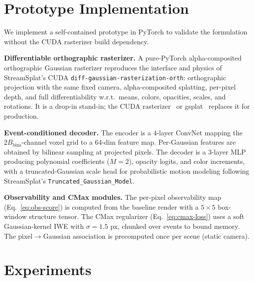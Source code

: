 \section{Prototype Implementation}
\label{sec:impl}

We implement a self-contained prototype in PyTorch to validate the formulation without the CUDA rasterizer build dependency.

\noindent\textbf{Differentiable orthographic rasterizer.}
A pure-PyTorch alpha-composited orthographic Gaussian rasterizer reproduces the interface and physics of StreamSplat's CUDA \texttt{diff-gaussian-rasterization-orth}: orthographic projection with the same fixed camera, alpha-composited splatting, per-pixel depth, and full differentiability w.r.t.\ means, colors, opacities, scales, and rotations. It is a drop-in stand-in; the CUDA rasterizer~\cite{kerbl3Dgaussians} or gsplat~\cite{ye2024gsplat} replaces it for production.

\noindent\textbf{Event-conditioned decoder.}
The encoder is a 4-layer ConvNet mapping the $2B_{\text{bins}}$-channel voxel grid to a 64-dim feature map. Per-Gaussian features are obtained by bilinear sampling at projected pixels. The decoder is a 3-layer MLP producing polynomial coefficients ($M{=}2$), opacity logits, and color increments, with a truncated-Gaussian scale head for probabilistic motion modeling following StreamSplat's \texttt{Truncated\_Gaussian\_Model}.

\noindent\textbf{Observability and CMax modules.}
The per-pixel observability map (Eq.~\ref{eq:obs-score}) is computed from the baseline render with a $5{\times}5$ box-window structure tensor. The CMax regularizer (Eq.~\ref{eq:cmax-loss}) uses a soft Gaussian-kernel IWE with $\sigma{=}1.5$ px, chunked over events to bound memory. The pixel$\to$Gaussian association is precomputed once per scene (static camera).

\section{Experiments}
\label{sec:experiments}

